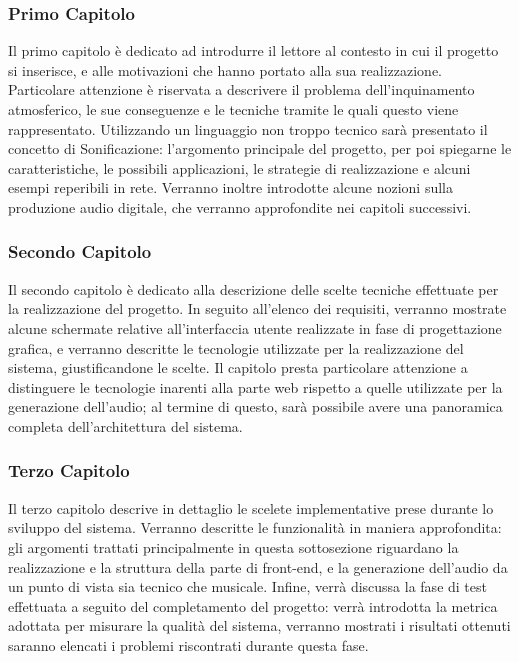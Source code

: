 \subsubsection{Primo Capitolo}
Il primo capitolo è dedicato ad introdurre il lettore al contesto in cui il progetto si inserisce, e alle motivazioni che hanno portato alla sua realizzazione.
Particolare attenzione è riservata a descrivere il problema dell'inquinamento atmosferico, le sue conseguenze e le tecniche tramite le quali questo viene rappresentato.
Utilizzando un linguaggio non troppo tecnico sarà presentato il concetto di Sonificazione: l'argomento principale del progetto, per poi spiegarne le caratteristiche, le possibili applicazioni, le strategie di realizzazione e alcuni esempi reperibili in rete.
Verranno inoltre introdotte alcune nozioni sulla produzione audio digitale, che verranno approfondite nei capitoli successivi.

\subsubsection{Secondo Capitolo}
Il secondo capitolo è dedicato alla descrizione delle scelte tecniche effettuate per la realizzazione del progetto.
In seguito all'elenco dei requisiti, verranno mostrate alcune schermate relative all'interfaccia utente realizzate in fase di progettazione grafica, e verranno descritte le tecnologie utilizzate per la realizzazione del sistema, giustificandone le scelte.
Il capitolo presta particolare attenzione a distinguere le tecnologie inarenti alla parte web rispetto a quelle utilizzate per la generazione dell'audio;
al termine di questo, sarà possibile avere una panoramica completa dell'architettura del sistema.

\subsubsection{Terzo Capitolo}
Il terzo capitolo descrive in dettaglio le scelete implementative prese durante lo sviluppo del sistema.
Verranno descritte le funzionalità in maniera approfondita: gli argomenti trattati principalmente in questa sottosezione riguardano la realizzazione e la struttura della parte di front-end, e la generazione dell'audio da un punto di vista sia tecnico che musicale.
Infine, verrà discussa la fase di test effettuata a seguito del completamento del progetto: verrà introdotta la metrica adottata per misurare la qualità del sistema, verranno mostrati i risultati ottenuti saranno elencati i problemi riscontrati durante questa fase.



\clearpage{\pagestyle{empty}\cleardoublepage}
